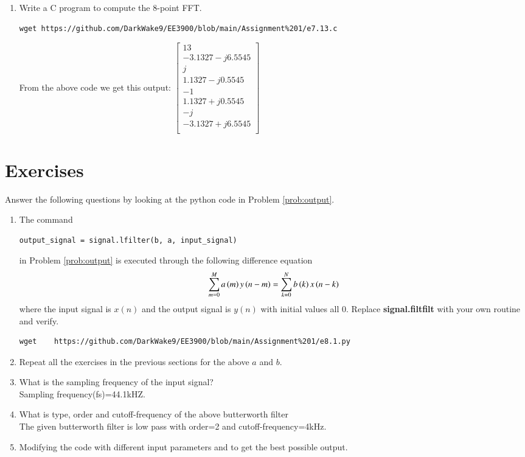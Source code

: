 \documentclass[journal,12pt,twocolumn]{IEEEtran}
\renewcommand\thesection{\arabic{section}}
\begin{document}
\begin{enumerate}[label=\arabic*.,ref=\thesection.\theenumi]
\item Write a C program to compute the 8-point FFT. \\

\solution
\begin{lstlisting}
wget https://github.com/DarkWake9/EE3900/blob/main/Assignment%201/e7.13.c
\end{lstlisting}

 From the above code we get this output:
$\begin{bmatrix}
	13\\
	-3.1327 - j6.5545\\
	j\\
	1.1327 - j0.5545\\
	-1\\
	1.1327 + j0.5545\\
	- j\\
	-3.1327 + j6.5545\\
\end{bmatrix}$
\vspace{1cm}



\end{enumerate}


\section{Exercises}
Answer the following questions by looking at the python code in Problem \ref{prob:output}.
\begin{enumerate}[label=\thesection.\arabic*]
\item
The command
\begin{lstlisting}
output_signal = signal.lfilter(b, a, input_signal)
\end{lstlisting}
in Problem \ref{prob:output} is executed through the following difference equation
\begin{equation}
	\label{eq:iir_filter_gen}
	\sum _{m=0}^{M}a\left(m\right)y\left(n-m\right)=\sum _{k=0}^{N}b\left(k\right)x\left(n-k\right)
\end{equation}
%
where the input signal is $x(n)$ and the output signal is $y(n)$ with initial values all 0. Replace
\textbf{signal.filtfilt} with your own routine and verify.\\
\solution
\begin{lstlisting}
wget	https://github.com/DarkWake9/EE3900/blob/main/Assignment%201/e8.1.py
\end{lstlisting}
\item Repeat all the exercises in the previous sections for the above $a$ and $b$.
\item What is the sampling frequency of the input signal?
\\
\solution
Sampling frequency(fs)=44.1kHZ.
\item
What is type, order and  cutoff-frequency of the above butterworth filter
\\
\solution
The given butterworth filter is low pass with order=2 and cutoff-frequency=4kHz.
%
\item
Modifying the code with different input parameters and to get the best possible output.
%
\end{enumerate}
\end{document}
